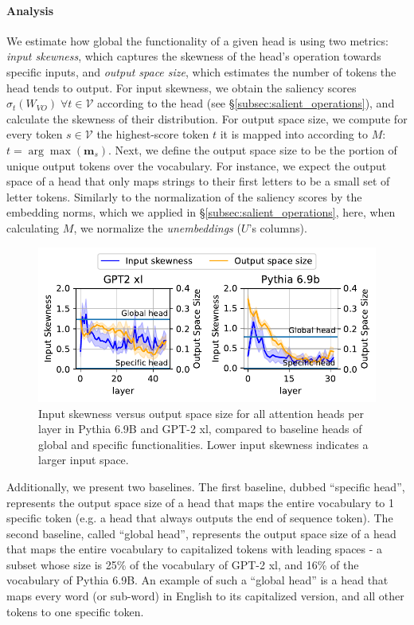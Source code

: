 \documentclass[11pt]{article}
\newcommand{\PythiaSevenB}{Pythia 6.9B}
\newcommand{\GPTxl}{GPT-2 xl}
\begin{document}
\paragraph{Analysis} 
We estimate how global the functionality of a given head is using two metrics: \textit{input skewness}, which captures the skewness of the head's operation towards specific inputs, and \textit{output space size}, which estimates the number of tokens the head tends to output. 
For input skewness, we obtain the saliency scores $\sigma_t (W_{VO}) \;\forall t\in \mathcal{V}$ according to the head (see \S\ref{subsec:salient_operations}), and calculate the skewness of their distribution. For output space size, we 
compute for every token $s \in \mathcal{V}$ the highest-score token $t$ it is mapped into according to $M$: $t = \arg\max(\mathbf{m}_s)$. Next, we define the output space size to be the portion of unique output tokens over the vocabulary.
For instance, we expect the output space of a head that only maps strings to their first letters to be a small set of letter tokens. Similarly to the normalization of the saliency scores by the embedding norms, which we applied in \S\ref{subsec:salient_operations}, here, when calculating $M$, we normalize the \emph{unembeddings} ($U$'s columns).


\begin{figure}[t]
    \centering
    \includegraphics[scale=0.55]
    {figures/skewness_vs_output_size}
    \caption{Input skewness versus output space size for all attention heads per layer in \PythiaSevenB{} and \GPTxl{}, compared to baseline heads of global and specific functionalities. Lower input skewness indicates a larger input space.
    }
    \label{fig:skewness_lineplots}
\end{figure}

Additionally, we present two baselines. The first baseline, dubbed ``specific head'', represents the output space size of a head that maps the entire vocabulary to 1 specific token (e.g. a head that always outputs the end of sequence token). The second baseline, called ``global head'', represents the output space size of a head that maps the entire vocabulary to capitalized tokens with leading spaces - a subset whose size is 25\% of the vocabulary of \GPTxl{}, and 16\% of the vocabulary of \PythiaSevenB{}. An example of such a ``global head'' is a head that maps every word (or sub-word) in English to its capitalized version, and all other tokens to one specific token.
\end{document}

